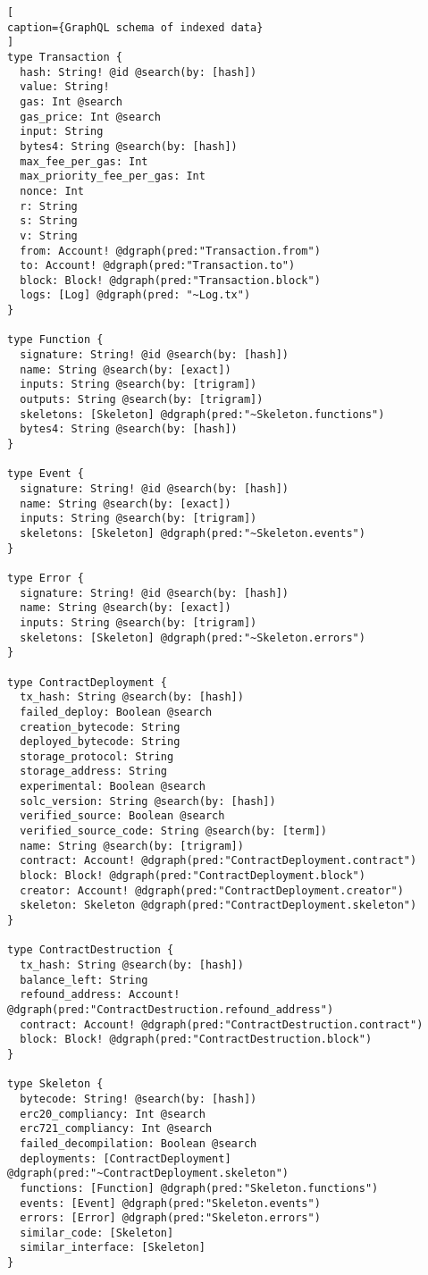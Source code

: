 \begin{lstlisting}[
caption={GraphQL schema of indexed data}
]
type Transaction {
  hash: String! @id @search(by: [hash])
  value: String! 
  gas: Int @search
  gas_price: Int @search
  input: String
  bytes4: String @search(by: [hash])
  max_fee_per_gas: Int
  max_priority_fee_per_gas: Int
  nonce: Int
  r: String
  s: String
  v: String
  from: Account! @dgraph(pred:"Transaction.from")
  to: Account! @dgraph(pred:"Transaction.to")
  block: Block! @dgraph(pred:"Transaction.block")
  logs: [Log] @dgraph(pred: "~Log.tx")
}

type Function {
  signature: String! @id @search(by: [hash])
  name: String @search(by: [exact])
  inputs: String @search(by: [trigram])
  outputs: String @search(by: [trigram])
  skeletons: [Skeleton] @dgraph(pred:"~Skeleton.functions")
  bytes4: String @search(by: [hash])
}

type Event {
  signature: String! @id @search(by: [hash])
  name: String @search(by: [exact])
  inputs: String @search(by: [trigram])
  skeletons: [Skeleton] @dgraph(pred:"~Skeleton.events")
}

type Error {
  signature: String! @id @search(by: [hash])
  name: String @search(by: [exact])
  inputs: String @search(by: [trigram])
  skeletons: [Skeleton] @dgraph(pred:"~Skeleton.errors")
}

type ContractDeployment {
  tx_hash: String @search(by: [hash])
  failed_deploy: Boolean @search
  creation_bytecode: String
  deployed_bytecode: String
  storage_protocol: String
  storage_address: String
  experimental: Boolean @search
  solc_version: String @search(by: [hash])
  verified_source: Boolean @search
  verified_source_code: String @search(by: [term])
  name: String @search(by: [trigram])
  contract: Account! @dgraph(pred:"ContractDeployment.contract")
  block: Block! @dgraph(pred:"ContractDeployment.block")
  creator: Account! @dgraph(pred:"ContractDeployment.creator")
  skeleton: Skeleton @dgraph(pred:"ContractDeployment.skeleton")
}

type ContractDestruction {
  tx_hash: String @search(by: [hash])
  balance_left: String
  refound_address: Account! @dgraph(pred:"ContractDestruction.refound_address")
  contract: Account! @dgraph(pred:"ContractDestruction.contract")
  block: Block! @dgraph(pred:"ContractDestruction.block")
}

type Skeleton {
  bytecode: String! @search(by: [hash])
  erc20_compliancy: Int @search
  erc721_compliancy: Int @search
  failed_decompilation: Boolean @search
  deployments: [ContractDeployment] @dgraph(pred:"~ContractDeployment.skeleton")
  functions: [Function] @dgraph(pred:"Skeleton.functions")
  events: [Event] @dgraph(pred:"Skeleton.events")
  errors: [Error] @dgraph(pred:"Skeleton.errors")
  similar_code: [Skeleton]
  similar_interface: [Skeleton]
}


\end{lstlisting}
